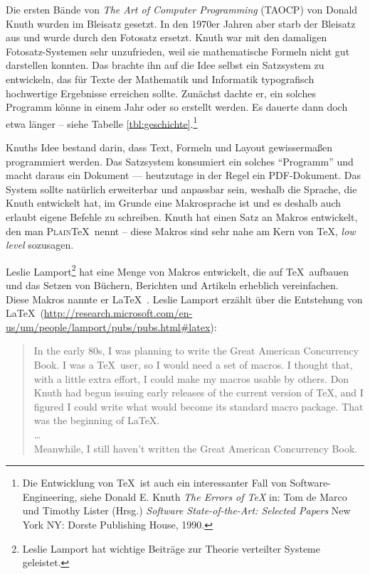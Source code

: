 Die ersten Bände von \emph{The Art of Computer Programming}
(\textsc{TAOCP}) von Donald Knuth wurden im Bleisatz gesetzt. In den
1970er Jahren aber starb der Bleisatz aus und wurde durch den Fotosatz
ersetzt. Knuth war mit den damaligen Fotosatz-Systemen sehr unzufrieden,
weil sie mathematische Formeln nicht gut darstellen konnten. Das brachte
ihn auf die Idee selbst ein Satzsystem zu entwickeln, das für
Texte der Mathematik und Informatik typografisch hochwertige Ergebnisse
erreichen sollte. Zunächst dachte er, ein solches Programm könne in
einem Jahr oder so erstellt werden. Es dauerte dann doch etwa
länger -- siehe Tabelle \ref{tbl:geschichte}.\footnote{ Die Entwicklung
von \TeX\ ist auch ein interessanter Fall von Software-Engineering,
    siehe Donald E. Knuth \emph{The Errors of \TeX} in: Tom de Marco und
    Timothy Lister (Hrsg.) \emph{Software State-of-the-Art: Selected
    Papers} New York NY: Dorste Publishing House, 1990.}

Knuths Idee \cite{knuth99} bestand darin, dass Text, Formeln und Layout
gewissermaßen programmiert werden. Das Satzsystem konsumiert ein solches
\enquote{Programm} und macht daraus ein Dokument --- heutzutage in der
Regel ein PDF-Dokument. Das System sollte natürlich erweiterbar und
anpassbar sein, weshalb die Sprache, die Knuth entwickelt hat, im Grunde
eine Makrosprache ist und es deshalb auch erlaubt eigene Befehle zu
schreiben. Knuth hat einen Satz an Makros entwickelt, den man
\textsc{Plain}\kern2pt\TeX\ nennt -- diese Makros sind sehr nahe am Kern
von \TeX, \emph{low level} sozusagen.

Leslie Lamport\footnote{ Leslie Lamport hat wichtige Beiträge zur
Theorie verteilter Systeme geleistet.} hat eine Menge von Makros
entwickelt, die auf \TeX\ aufbauen und das Setzen von Büchern, Berichten
und Artikeln erheblich vereinfachen. Diese Makros nannte er \LaTeX\
\cite{lamport94}. Leslie Lamport erzählt über die Entstehung von
\LaTeX\
(\url{http://research.microsoft.com/en-us/um/people/lamport/pubs/pubs.html#latex}):

\begin{quote}
    In the early 80s, I was planning to write the Great American Concurrency
    Book. I was a \TeX\ user, so I would need a set of macros. I thought
    that, with a little extra effort, I could make my macros usable by
    others. Don Knuth had begun issuing early releases of the current
    version of \TeX, and I figured I could write what would become its
    standard macro package. That was the beginning of \LaTeX.    \\
    \dots\\
    Meanwhile, I still haven't written the Great American Concurrency
    Book.
\end{quote}

